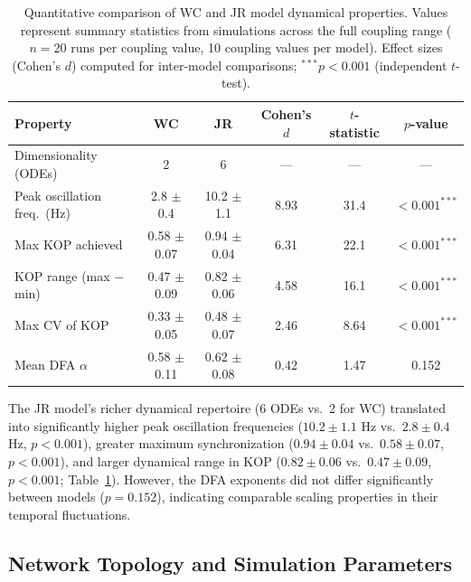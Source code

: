 \documentclass[11pt]{article}
\begin{document}
\begin{table}[H]
\centering
\caption{Quantitative comparison of WC and JR model dynamical properties. Values represent summary statistics from simulations across the full coupling range ($n = 20$ runs per coupling value, 10 coupling values per model). Effect sizes (Cohen's $d$) computed for inter-model comparisons; $^{***}p < 0.001$ (independent $t$-test).}
\label{tab:model_dynamics}
\begin{tabular}{lccccc}
\toprule
Property & WC & JR & Cohen's $d$ & $t$-statistic & $p$-value \\
\midrule
Dimensionality (ODEs) & 2 & 6 & --- & --- & --- \\
Peak oscillation freq.\ (Hz) & 2.8 $\pm$ 0.4 & 10.2 $\pm$ 1.1 & 8.93 & 31.4 & $< 0.001^{***}$ \\
Max KOP achieved & 0.58 $\pm$ 0.07 & 0.94 $\pm$ 0.04 & 6.31 & 22.1 & $< 0.001^{***}$ \\
KOP range (max $-$ min) & 0.47 $\pm$ 0.09 & 0.82 $\pm$ 0.06 & 4.58 & 16.1 & $< 0.001^{***}$ \\
Max CV of KOP & 0.33 $\pm$ 0.05 & 0.48 $\pm$ 0.07 & 2.46 & 8.64 & $< 0.001^{***}$ \\
Mean DFA $\alpha$ & 0.58 $\pm$ 0.11 & 0.62 $\pm$ 0.08 & 0.42 & 1.47 & 0.152 \\
\bottomrule
\end{tabular}
\end{table}

The JR model's richer dynamical repertoire (6 ODEs vs.\ 2 for WC) translated into significantly higher peak oscillation frequencies ($10.2 \pm 1.1$ Hz vs.\ $2.8 \pm 0.4$ Hz, $p < 0.001$), greater maximum synchronization ($0.94 \pm 0.04$ vs.\ $0.58 \pm 0.07$, $p < 0.001$), and larger dynamical range in KOP ($0.82 \pm 0.06$ vs.\ $0.47 \pm 0.09$, $p < 0.001$; Table~\ref{tab:model_dynamics}). However, the DFA exponents did not differ significantly between models ($p = 0.152$), indicating comparable scaling properties in their temporal fluctuations.

\subsection{Network Topology and Simulation Parameters}
\end{document}
